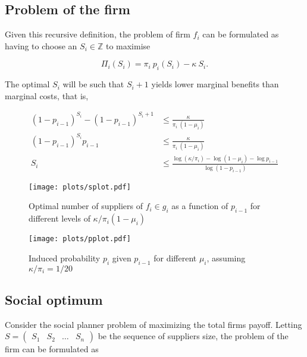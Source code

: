 \documentclass[american, abstract=on]{scrartcl}
\begin{document}
\subsection{Problem of the firm}

Given this recursive definition, the problem of firm $f_i$ can be formulated as having to choose an $S_i \in \mathbb{Z}$ to maximise

\begin{equation}
  \Pi_i(S_i) = \pi_i \ p_i(S_i) - \kappa \ S_i.
\end{equation}

The optimal $S_i$ will be such that $S_i + 1$ yields lower marginal benefits than marginal costs, that is,

\begin{equation}
  \begin{split}
    (1 - p_{i-1})^{S_i} - (1 - p_{i-1})^{S_i + 1} &\leq \frac{\kappa}{\pi_i \ (1 - \mu_i)} \\
    (1 - p_{i-1})^{S_i} p_{i - 1} &\leq \frac{\kappa}{\pi_i \ (1 - \mu_i)} \\
    S_i&\leq \frac{\log\left( \kappa / \pi_i \right) - \log(1 - \mu_i) - \log p_{i - 1}}{\log(1 - p_{i-1})}
  \end{split}
\end{equation}

\begin{figure}[H]
  \centering
  \texttt{[image: plots/splot.pdf]} 
  \caption{Optimal number of suppliers of $f_i \in g_i$ as a function of $p_{i - 1}$ for different levels of $\kappa \Big/ \pi_i (1 - \mu_i)$}
  \label{fig:splot}
\end{figure}

\begin{figure}[H]
  \centering
  \texttt{[image: plots/pplot.pdf]} 
  \caption{Induced probability $p_i$ given $p_{i - 1}$ for different $\mu_i$, assuming $\kappa / \pi_i = 1/20$}
  \label{fig:pplot}
\end{figure}

\subsection{Social optimum}

Consider the social planner problem of maximizing the total firms payoff. Letting $S = \begin{pmatrix} S_1 & S_2 & \ldots & S_n \end{pmatrix}$ be the sequence of suppliers size, the problem of the firm can be formulated as
\end{document}
